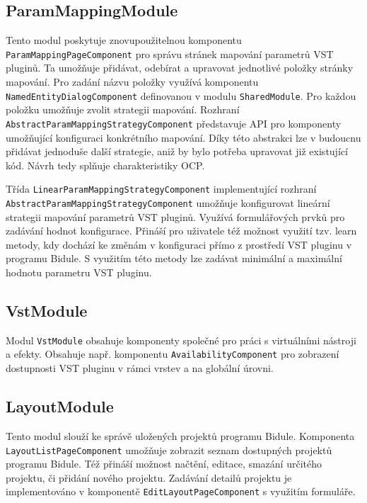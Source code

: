 \documentclass[thesis=M,czech]{FITthesis}[2019/03/06]
\begin{document}
		\subsection{ParamMappingModule}
			Tento modul poskytuje znovupoužitelnou komponentu \texttt{Param\-Mapping\-Page\-Component} pro správu stránek mapování parametrů VST pluginů. Ta umožňuje přidávat, odebírat a upravovat jednotlivé položky stránky mapování. Pro zadání názvu položky
			využívá komponentu \texttt{Named\-Entity\-Dialog\-Component} definovanou v modulu \texttt{SharedModule}.			
			Pro každou položku umožňuje zvolit strategii mapování. Rozhraní \texttt{Abstract\-Param\-Mapping\-Strategy\-Component} představuje API pro komponenty umožňující konfiguraci konkrétního mapování. Díky této abstrakci lze v budoucnu přidávat jednoduše další 
			strategie, aniž by bylo potřeba upravovat již existující kód. Návrh tedy splňuje charakteristiky OCP\cite{ocp}.
			
			Třída \texttt{Linear\-Param\-Mapping\-Strategy\-Component} implementující rozhraní \texttt{Abstract\-Param\-Mapping\-Strategy\-Component}
			umožňuje konfigurovat lineární strategii mapování parametrů VST pluginů. Využívá formulářových prvků pro zadávání
			hodnot konfigurace. Přináší pro uživatele též možnost využití tzv. learn metody, kdy dochází ke změnám v konfiguraci
			přímo z prostředí VST pluginu v programu Bidule. S využitím této metody lze zadávat minimální a maximální hodnotu
			parametru VST pluginu.		
		
		\subsection{VstModule}
			Modul \texttt{VstModule} obsahuje komponenty společné pro práci s virtuálními nástroji a efekty.
			Obsahuje např. komponentu \texttt{Availability\-Component} pro zobrazení dostupnosti VST pluginu v rámci vrstev a na globální úrovni.
			
		\subsection{LayoutModule}
			Tento modul slouží ke správě uložených projektů programu Bidule.
			Komponenta \texttt{Layout\-List\-Page\-Component} umožňuje zobrazit seznam dostupných projektů programu Bidule.
			Též přináší možnost načtění, editace, smazání určitého projektu, či přidání nového projektu. 
			Zadávání detailů projektu je implementováno v komponentě \texttt{Edit\-Layout\-Page\-Component} s využitím formuláře.			
\end{document}
